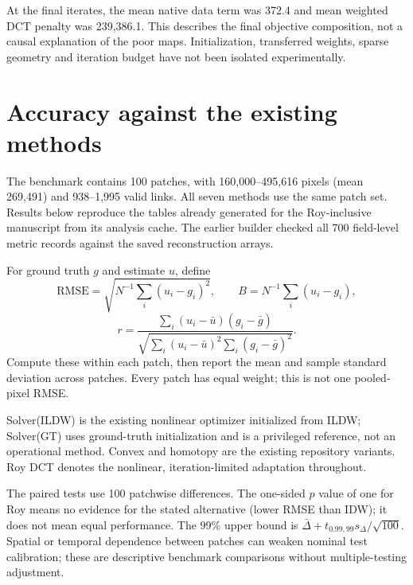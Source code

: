 \documentclass[11pt,a4paper]{article}
\begin{document}
At the final iterates, the mean native data term was 372.4 and mean weighted DCT penalty was 239,386.1. This describes the final objective composition, not a causal explanation of the poor maps. Initialization, transferred weights, sparse geometry and iteration budget have not been isolated experimentally.
\clearpage
\section{Accuracy against the existing methods}
The benchmark contains 100 patches, with 160,000--495,616 pixels (mean 269,491) and 938--1,995 valid links. All seven methods use the same patch set. Results below reproduce the tables already generated for the Roy-inclusive manuscript from its analysis cache. The earlier builder checked all 700 field-level metric records against the saved reconstruction arrays.

For ground truth $g$ and estimate $u$, define
\[
 \mathrm{RMSE}=\sqrt{N^{-1}\sum_i(u_i-g_i)^2},\qquad
 B=N^{-1}\sum_i(u_i-g_i),
\]
\[
 r=\frac{\sum_i(u_i-\bar u)(g_i-\bar g)}
 {\sqrt{\sum_i(u_i-\bar u)^2\sum_i(g_i-\bar g)^2}}.
\]
Compute these within each patch, then report the mean and sample standard deviation across patches. Every patch has equal weight; this is not one pooled-pixel RMSE.

Solver(ILDW) is the existing nonlinear optimizer initialized from ILDW; Solver(GT) uses ground-truth initialization and is a privileged reference, not an operational method. Convex and homotopy are the existing repository variants. Roy DCT denotes the nonlinear, iteration-limited adaptation throughout.

The paired tests use 100 patchwise differences. The one-sided $p$ value of one for Roy means no evidence for the stated alternative (lower RMSE than IDW); it does not mean equal performance. The 99\% upper bound is $\bar\Delta+t_{0.99,99}s_\Delta/\sqrt{100}$. Spatial or temporal dependence between patches can weaken nominal test calibration; these are descriptive benchmark comparisons without multiple-testing adjustment.
\clearpage
\end{document}
